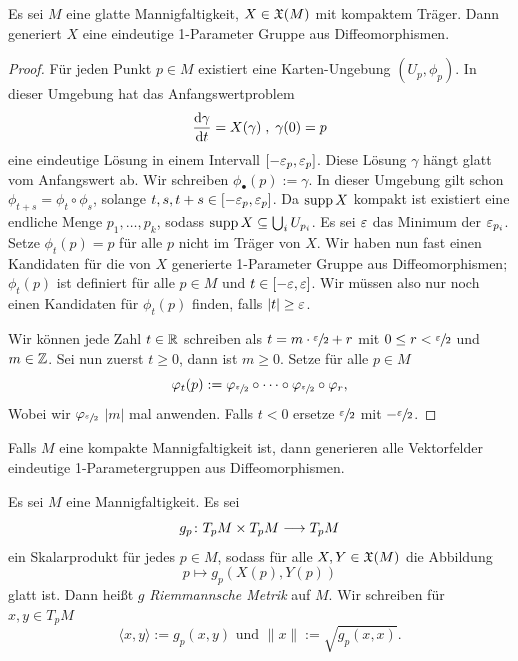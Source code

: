 \begin{prop}
    \label{prop: kompaktes VF generiert 1-param. grp.}
    Es sei $M$ eine glatte Mannigfaltigkeit, $X \in { \mathfrak{X} } (M)$ mit kompaktem Träger. Dann 
    generiert $X$ eine eindeutige 1-Parameter Gruppe aus Diffeomorphismen.
\end{prop}

\begin{proof}
    Für jeden Punkt $p \in M$ existiert eine Karten-Ungebung $(U_p, \phi_p)$. In dieser
    Umgebung hat das Anfangswertproblem
    \[ \derive[\gamma]{t} = X (\gamma) \; , \; \gamma(0) = p \]
    eine eindeutige Lösung in einem Intervall $[-\varepsilon_p, \varepsilon_p]$. Diese Lösung 
    $\gamma$ hängt glatt vom Anfangswert ab. Wir schreiben
    $\phi_{\bullet}(p) := \gamma$. In dieser Umgebung gilt schon \\ 
    $\phi_{t + s} = \phi_t \circ \phi_s$, solange $t, s, t + s \in [-\varepsilon_p, \varepsilon_p]$. 
    Da ${ \operatorname{supp} } \, X$ kompakt ist existiert eine endliche Menge ${p_1, \dots, p_k}$, 
    sodass ${ \operatorname{supp} } \, X \subseteq \bigcup_i U_{p_i}$. Es sei $\varepsilon$ das Minimum der 
    $\varepsilon_{p_i}$. Setze $\phi_t(p) = p$ für alle $p$ nicht im Träger von $X$. Wir haben nun 
    fast einen Kandidaten für die von $X$ generierte 1-Parameter Gruppe aus Diffeomorphismen;
    $\phi_t(p)$ ist definiert für alle $p \in M$ und $t \in [-\varepsilon, \varepsilon]$. Wir müssen also nur 
    noch einen Kandidaten für $\phi_t(p)$ finden, falls $|t| \geq \varepsilon$.

    Wir können jede Zahl $t \in { \mathbb R }$ schreiben als $t = m \cdot \sfrac{\varepsilon}{2} + r$ mit 
    $0 \leq r < \sfrac{\varepsilon}{2}$ und $m \in { \mathbb Z }$. Sei nun zuerst $t \geq 0$, dann ist $m \geq 0$.
    Setze für alle $p \in M$ 
    \[ \varphi_t(p) 
        := \varphi_{\sfrac{\varepsilon}{2}} \circ \dots \circ \varphi_{\sfrac{\varepsilon}{2}} \circ \varphi_r , \] 
    Wobei wir $\varphi_{\sfrac{\varepsilon}{2}}$ $|m|$ mal anwenden. Falls $t < 0$ ersetze $\sfrac{\varepsilon}{2}$
    mit $- \sfrac{\varepsilon}{2}$. 
\end{proof}

\begin{remark}
    Falls $M$ eine kompakte Mannigfaltigkeit ist, dann generieren alle Vektorfelder eindeutige 
    1-Parametergruppen aus Diffeomorphismen.
\end{remark}

\begin{definition}
    \label{def: riemannsche metrik}
    Es sei $M$ eine Mannigfaltigkeit. Es sei 
    \[ g_p \colon T_pM \times T_pM \longrightarrow T_pM \]
    ein Skalarprodukt für jedes $p \in M$, sodass für alle $X, Y \in { \mathfrak{X} } (M)$ die Abbildung 
    \[ p \longmapsto g_p(X(p), Y(p)) \]
    glatt ist. Dann heißt $g$ \textit{Riemmannsche Metrik} auf $M$. Wir schreiben für 
    $x, y \in T_pM$ 
    \[ \langle x, y \rangle := g_p(x, y) \text{ und } \| x \| := \sqrt{g_p(x, x)} . \]
\end{definition}


